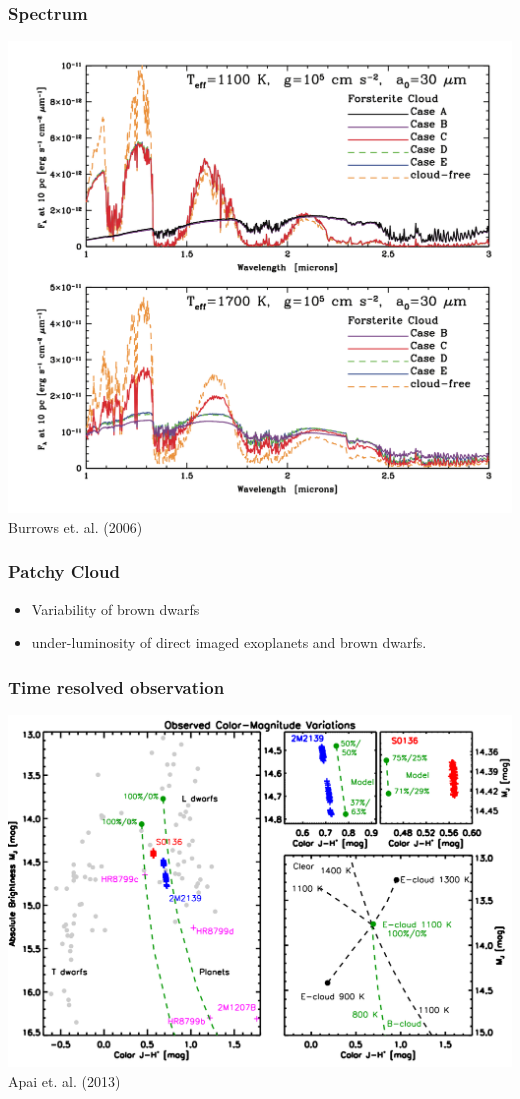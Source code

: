 \documentclass[14pt]{beamer}
\newcommand*\figcite[1]{\vspace*{\fill}\raggedleft\footnotesize{#1}}
\begin{document}
\begin{frame}
  \frametitle{Spectrum}
  \centering
  \includegraphics[height=0.85\textheight]{spec}\\
  \figcite{Burrows et. al. (2006)}
\end{frame}

\begin{frame}
  \frametitle{Patchy Cloud}
  \begin{itemize}
  \item Variability of brown dwarfs
  \item under-luminosity of direct imaged exoplanets and brown dwarfs.
  \end{itemize}
\end{frame}

\begin{frame}
  \frametitle{Time resolved observation}
  \includegraphics[width=\textwidth]{CMD}\\
  \figcite{Apai et. al. (2013)}
\end{frame}
\end{document}
